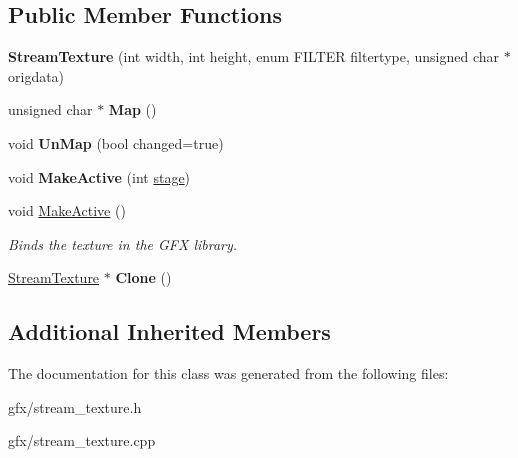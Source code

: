 \subsection*{Public Member Functions}
\begin{DoxyCompactItemize}
\item 
{\bfseries Stream\+Texture} (int width, int height, enum F\+I\+L\+T\+ER filtertype, unsigned char $\ast$origdata)\hypertarget{classStreamTexture_af9af667cafc5f235c4cee8faf1d0249c}{}\label{classStreamTexture_af9af667cafc5f235c4cee8faf1d0249c}

\item 
unsigned char $\ast$ {\bfseries Map} ()\hypertarget{classStreamTexture_a9350d42919bec0dd45d9fdb0fd247687}{}\label{classStreamTexture_a9350d42919bec0dd45d9fdb0fd247687}

\item 
void {\bfseries Un\+Map} (bool changed=true)\hypertarget{classStreamTexture_af9c2630cbcd2c1d53805cf2f784e9310}{}\label{classStreamTexture_af9c2630cbcd2c1d53805cf2f784e9310}

\item 
void {\bfseries Make\+Active} (int \hyperlink{classTexture_aa38999434f9fcf409ca20b4523852b7b}{stage})\hypertarget{classStreamTexture_a23b6254fe18552a3401c79a77b47190d}{}\label{classStreamTexture_a23b6254fe18552a3401c79a77b47190d}

\item 
void \hyperlink{classStreamTexture_a34486e0d9c72ef5b00d718f18fe7b4be}{Make\+Active} ()\hypertarget{classStreamTexture_a34486e0d9c72ef5b00d718f18fe7b4be}{}\label{classStreamTexture_a34486e0d9c72ef5b00d718f18fe7b4be}

\begin{DoxyCompactList}\small\item\em Binds the texture in the G\+FX library. \end{DoxyCompactList}\item 
\hyperlink{classStreamTexture}{Stream\+Texture} $\ast$ {\bfseries Clone} ()\hypertarget{classStreamTexture_afe64d9560497563df220691bd4fbe99a}{}\label{classStreamTexture_afe64d9560497563df220691bd4fbe99a}

\end{DoxyCompactItemize}
\subsection*{Additional Inherited Members}


The documentation for this class was generated from the following files\+:\begin{DoxyCompactItemize}
\item 
gfx/stream\+\_\+texture.\+h\item 
gfx/stream\+\_\+texture.\+cpp\end{DoxyCompactItemize}
